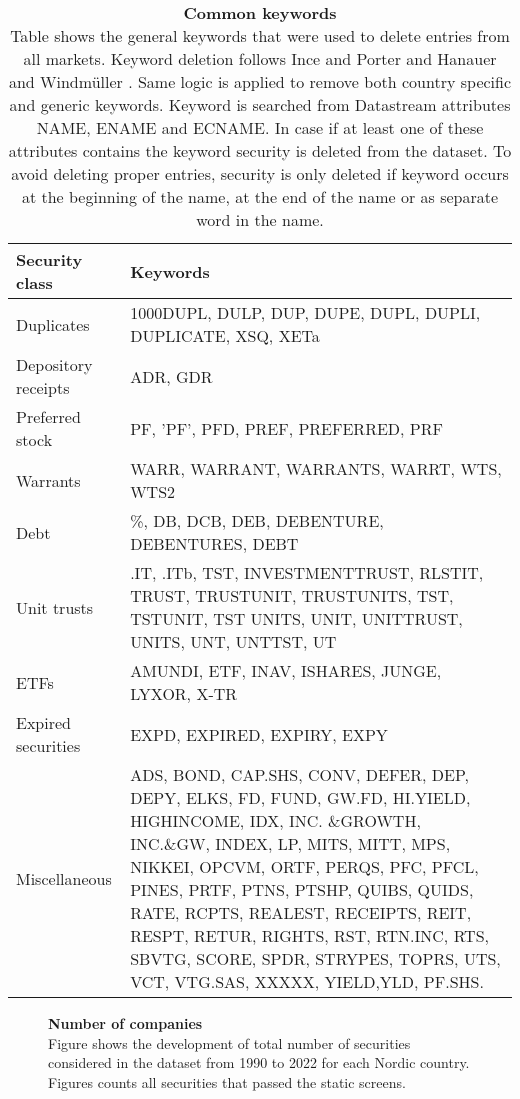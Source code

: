 \documentclass{article}
\begin{document}
\begin{table}[ht] 
\small
\caption[Common keywords]{\textbf{Common keywords}\\ Table shows the general keywords that were used to delete entries from all markets. Keyword deletion follows Ince and Porter \protect\citeyear{Ince2006} and Hanauer and Windmüller \protect\citeyear{HANAUER2023106712}. Same logic is applied to remove both country specific and generic keywords. Keyword is searched from Datastream attributes NAME, ENAME and ECNAME. In case if at least one of these attributes contains the keyword security is deleted from the dataset. To avoid deleting proper entries, security is only deleted if keyword occurs at the beginning of the name, at the end of the name or as separate word in the name.}
 \label{table:GeneralKeywords}
\centering
\begin{tabularx}{\textwidth}{l X}
\toprule
Security class 	& Keywords \\
\midrule
Duplicates 		& 1000DUPL, DULP, DUP, DUPE, DUPL, DUPLI, DUPLICATE, XSQ, XETa  \\[1ex]
Depository receipts	& ADR, GDR \\[1ex]
Preferred stock 	&  PF, ’PF’, PFD, PREF, PREFERRED, PRF\\ [1ex]
Warrants 			&  WARR, WARRANT, WARRANTS, WARRT, WTS, WTS2\\[1ex]
Debt 			& \%, DB, DCB, DEB, DEBENTURE, DEBENTURES, DEBT\\[1ex]
Unit trusts 		& .IT, .ITb, TST, INVESTMENTTRUST, RLSTIT, TRUST, TRUSTUNIT, TRUSTUNITS, TST, TSTUNIT, TST UNITS, UNIT, UNITTRUST, UNITS, UNT, UNTTST, UT\\[1ex]
ETFs 			& AMUNDI, ETF, INAV, ISHARES, JUNGE, LYXOR, X-TR\\[1ex]
Expired securities 	& EXPD, EXPIRED, EXPIRY, EXPY\\[1ex]
Miscellaneous 		& ADS, BOND, CAP.SHS, CONV, DEFER, DEP, DEPY, ELKS, FD, FUND, GW.FD, HI.YIELD, HIGHINCOME, IDX, INC.								\&GROWTH, INC.\&GW, INDEX, LP, MITS, MITT, MPS, NIKKEI, OPCVM, ORTF, PERQS, 												PFC, PFCL, PINES, PRTF, PTNS, PTSHP, QUIBS, QUIDS, RATE, RCPTS, REALEST, RECEIPTS, REIT, RESPT, 								RETUR, RIGHTS, RST, RTN.INC, RTS, SBVTG, SCORE, SPDR, STRYPES, TOPRS, UTS, VCT, VTG.SAS, 									XXXXX, YIELD,YLD, PF.SHS.\\
 \bottomrule
 \end{tabularx}
 \end{table} 

\begin{figure}[ht]
\centering
\caption[Number of companies]{\textbf{Number of companies}\\ Figure shows the development of total number of securities considered in the dataset from 1990 to 2022 for each Nordic country. Figures counts all securities that passed the static screens.}

\label{plot:number_of_companies}
\end{figure}
\end{document}
